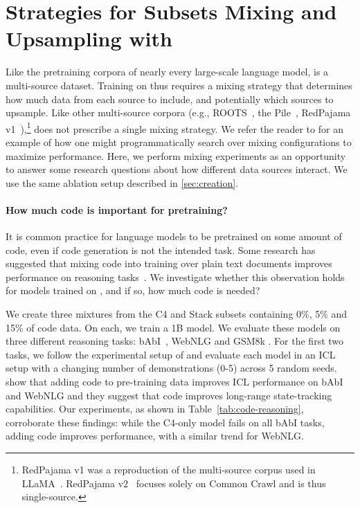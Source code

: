 \section{Strategies for Subsets Mixing and Upsampling with \dolma}
\label{sec:mixtures}


Like the pretraining corpora of nearly every large-scale language model, \dolma is a multi-source dataset. 
Training on \dolma thus requires a mixing strategy that determines how much data from each source to include, and potentially which sources to upsample. 
Like other multi-source corpora (e.g., ROOTS~\citep{Laurenccon2023TheBR}, the Pile~\citep{Gao2020ThePA}, RedPajama v1~\citep{together2023redpajama}),\footnote{RedPajama v1 was a reproduction of the multi-source corpus used in LLaMA~\citep{Touvron2023LLaMAOA}. RedPajama v2~\citep{redpajama2} focuses solely on Common Crawl and is thus single-source.} \dolma does not prescribe a single mixing strategy. 
We refer the reader to \citet{Rae2021ScalingLM} for an example of how one might programmatically search over mixing configurations to maximize performance. 
Here, we perform mixing experiments as an opportunity to answer some research questions about how different data sources interact. 
We use the same ablation setup described in \autoref{sec:creation}.



\paragraph{How much code is important for pretraining?} It is common practice for language models to be pretrained on some amount of code, even if code generation is not the intended task.
Some research has suggested that mixing code into training over plain text documents improves performance on reasoning tasks~\citep{madaan-etal-2022-language}.
We investigate whether this observation holds for models trained on \dolma, and if so, how much code is needed?




We create three mixtures from the C4 and Stack subsets containing 0\%, 5\% and 15\% of code data.
On each, we train a 1B model. 
We evaluate these models on three different reasoning tasks: bAbI~\citep{Weston2015TowardsAQ}, WebNLG \cite{gardent-etal-2017-creating} and GSM8k \cite{Cobbe2021TrainingVT}. For the first two tasks, we follow the experimental setup of \citet{muennighoff2023scaling} and evaluate each model in an ICL setup with a changing number of demonstrations (0-5) across 5 random seeds. \citet{muennighoff2023scaling} show that adding code to pre-training data improves ICL performance on bAbI and WebNLG and they suggest that code improves long-range state-tracking capabilities. Our experiments, as shown in Table~\ref{tab:code-reasoning}, corroborate these findings: while the C4-only model fails on all bAbI tasks, adding code improves performance, with a similar trend for WebNLG. 


